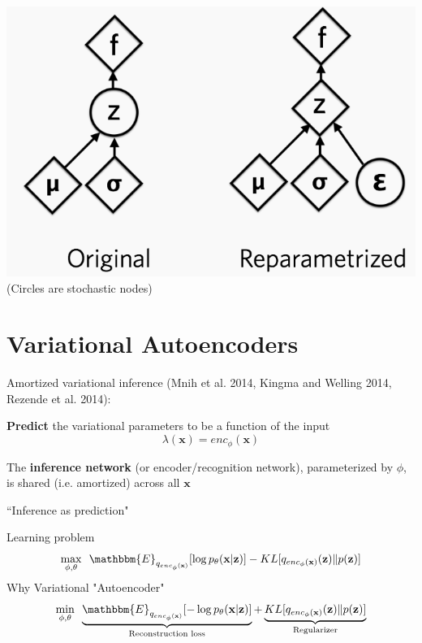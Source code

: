 \documentclass{beamer}
\let\tempone\itemize
\let\temptwo\enditemize
\renewenvironment{itemize}{\tempone\addtolength{\itemsep}{0.5\baselineskip}}{\temptwo}
\newcommand{\zvec}{\mathbf{z}}
\newcommand{\E}{\mathbbm{E}}
\newcommand{\xvec}{\mathbf{x}}
\begin{document}
\begin{frame}
  \begin{center}
   \end{center}
   \center
\includegraphics[scale=0.35]{img/reparam} \\
(Circles are stochastic nodes)
\end{frame}

\section{Variational Autoencoders}
\begin{frame}
  \begin{center}
   \end{center}
Amortized variational inference (Mnih et al. 2014, Kingma and Welling 2014, Rezende et al. 2014):
\begin{itemize}
\item  \textbf{Predict} the variational parameters to be a function of the input
\[ \lambda(\xvec) = enc_\phi (\xvec) \]
\item The \textbf{inference network} (or encoder/recognition network), parameterized by $\phi$, is shared (i.e. amortized) across all $\xvec$
\item ``Inference as prediction"
\end{itemize}
\end{frame}

\begin{frame}
  \begin{center}
   \end{center}
Learning problem
\[ \max_{\phi, \theta} \,\,\, \E_{q_{enc_\phi(\xvec)}}[\log p_\theta (\xvec | \zvec)] - KL[q_{enc_\phi(\xvec)}(\zvec) \Vert p(\zvec)]\]
Why Variational "Autoencoder"
\[ \min_{\phi, \theta}  \,\,\, \underbrace{\E_{q_{enc_\phi(\xvec)}}[-\log p_\theta (\xvec | \zvec)]}_{\text{Reconstruction loss}} + \underbrace{KL[q_{enc_\phi(\xvec)}(\zvec) \Vert p(\zvec)]}_{\text{Regularizer}}\]
\end{frame}
\end{document}
